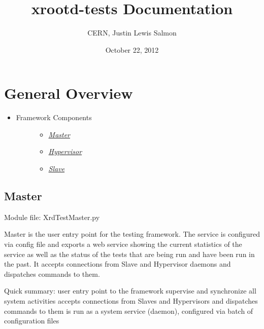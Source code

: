 \documentclass[letterpaper,10pt,english]{sphinxmanual}
\title{xrootd-tests Documentation}
\date{October 22, 2012}
\author{CERN, Justin Lewis Salmon}
\begin{document}
\maketitle
\tableofcontents
{}\label{index::doc}



\chapter{General Overview}
\label{general-overview:general-overview}\label{general-overview::doc}\label{general-overview:xrdtest-framework-release-documentation}\begin{itemize}
\item {} \begin{description}
\item[{Framework Components}] \leavevmode\begin{itemize}
\item {} 
{\hyperref[general-overview:master]{\emph{Master}}}

\item {} 
{\hyperref[general-overview:hypervisor]{\emph{Hypervisor}}}

\item {} 
{\hyperref[general-overview:slave]{\emph{Slave}}}

\end{itemize}

\end{description}

\end{itemize}


\section{Master}
\label{general-overview:master}\label{general-overview:id1}
Module file: XrdTestMaster.py

Master is the user entry point for the testing framework. The service is configured via config file and
exports a web service showing the current statistics of the service as well as the status of the tests that
are being run and have been run in the past.
It accepts connections from Slave and Hypervisor daemons and dispatches commands to them.

Quick summary:
user entry point to the framework
supervise and synchronize all system activities
accepts connections from Slaves and Hypervisors and dispatches commands to them
is run as a system service (daemon), configured via batch of configuration files
\end{document}
